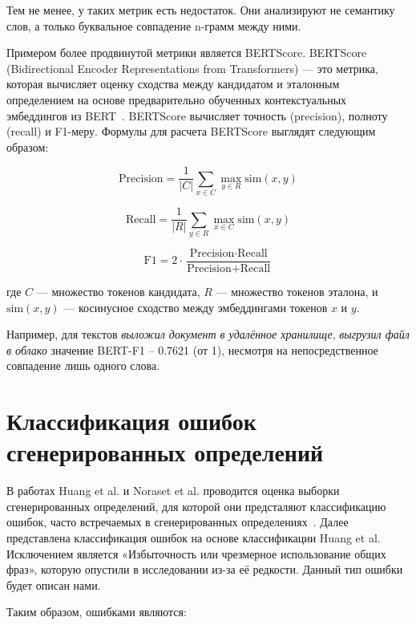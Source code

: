 \documentclass[LI,VKR]{HSEUniversity}
\begin{document}
Тем не менее, у таких метрик есть недостаток.
Они анализируют не семантику слов, а только буквальное совпадение n-грамм между ними.

Примером более продвинутой метрики является BERTScore.
BERTScore (Bidirectional Encoder Representations from Transformers) — это метрика,
которая вычисляет оценку сходства между кандидатом и эталонным определением
на основе предварительно обученных контекстуальных эмбеддингов из BERT~\cite{BERTScore}.
BERTScore вычисляет точность (precision), полноту (recall) и F1-меру.
Формулы для расчета BERTScore выглядят следующим образом:

\begin{equation}
\text{Precision} = \frac{1}{|C|} \sum_{x \in C} \max_{y \in R} \text{sim}(x, y)
\end{equation}

\begin{equation}
\text{Recall} = \frac{1}{|R|} \sum_{y \in R} \max_{x \in C} \text{sim}(x, y)
\end{equation}

\begin{equation}
\text{F1} = 2 \cdot \frac{\text{Precision} \cdot \text{Recall}}{\text{Precision} + \text{Recall}}
\end{equation}

где $C$ — множество токенов кандидата, $R$ — множество токенов эталона,
и $\text{sim}(x, y)$ — косинусное сходство между эмбеддингами токенов $x$ и $y$.

Например, для текстов \textit{выложил документ в удалённое хранилище}, \textit{выгрузил файл в облако}
значение BERT-F1 -- 0.7621 (от 1), несмотря на непосредственное совпадение лишь одного слова.

\section{Классификация ошибок сгенерированных определений}

В работах Huang et al. и Noraset et al. проводится оценка выборки сгенерированных определений,
для которой они предсталяют классификацию ошибок,
часто встречаемых в сгенерированных определениях~\cite{huang-etal-2021-definition, noraset2016definition}.
Далее представлена классификация ошибок на основе классификации Huang et al.
Исключением является «Избыточность или чрезмерное использование общих фраз»,
которую опустили в исследовании из-за её редкости.
Данный тип ошибки будет описан нами.

Таким образом, ошибками являются:
\end{document}
